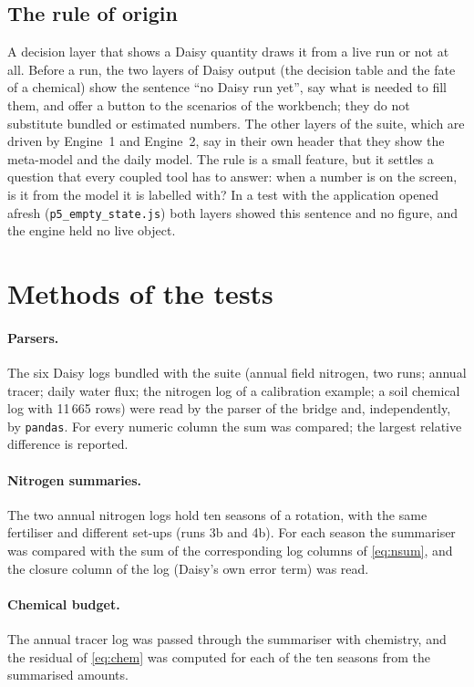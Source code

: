 \subsection{The rule of origin}
A decision layer that shows a Daisy quantity draws it from a live run or not at all. Before a run, the two layers of Daisy output (the decision table and the fate of a chemical) show the sentence ``no Daisy run yet'', say what is needed to fill them, and offer a button to the scenarios of the workbench; they do not substitute bundled or estimated numbers. The other layers of the suite, which are driven by Engine~1 and Engine~2, say in their own header that they show the meta-model and the daily model. The rule is a small feature, but it settles a question that every coupled tool has to answer: when a number is on the screen, is it from the model it is labelled with? In a test with the application opened afresh (\texttt{p5\_empty\_state.js}) both layers showed this sentence and no figure, and the engine held no live object.

\section{Methods of the tests}
\paragraph{Parsers.} The six Daisy logs bundled with the suite (annual field nitrogen, two runs; annual tracer; daily water flux; the nitrogen log of a calibration example; a soil chemical log with 11\,665 rows) were read by the parser of the bridge and, independently, by \texttt{pandas}. For every numeric column the sum was compared; the largest relative difference is reported.

\paragraph{Nitrogen summaries.} The two annual nitrogen logs hold ten seasons of a rotation, with the same fertiliser and different set-ups (runs 3b and 4b). For each season the summariser was compared with the sum of the corresponding log columns of \cref{eq:nsum}, and the closure column of the log (Daisy's own error term) was read.

\paragraph{Chemical budget.} The annual tracer log was passed through the summariser with chemistry, and the residual of \cref{eq:chem} was computed for each of the ten seasons from the summarised amounts.

